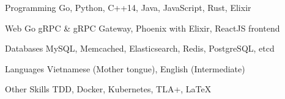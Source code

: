 


\begin{cvskills}


\cvskill
{Programming} %
{Go, Python, C++14, Java, JavaScript, Rust, Elixir} %


\cvskill
{Web} %
{Go gRPC \& gRPC Gateway, Phoenix with Elixir, ReactJS frontend} %

\cvskill
{Databases} %
{MySQL, Memcached, Elasticsearch, Redis, PostgreSQL, etcd} %


\cvskill
{Languages} %
{Vietnamese (Mother tongue), English (Intermediate)} %


\cvskill
{Other Skills} %
{TDD, Docker, Kubernetes, TLA+, LaTeX}%


\end{cvskills}

